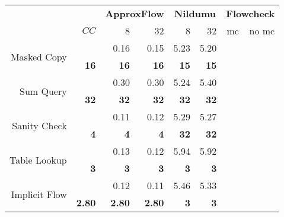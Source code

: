 \begin{table}[]
\begin{tabular}{rr|rr|rr|rr}
                                      & \textbf{}     & \multicolumn{2}{c|}{\textbf{ApproxFlow}}                 & \multicolumn{2}{c|}{\textbf{Nildumu}} & \multicolumn{2}{c}{\textbf{Flowcheck}} \\
                                      & $CC$          & 8                      & 32                     & 8             & 32           & mc             & no mc         \\ \hline
\multirow{2}{*}{Masked Copy}          &               & 0.16                   & 0.15                   & 5.23          & 5.20         &                &               \\
                                      & \textbf{16}   & \textbf{16}            & \textbf{16}            & \textbf{15}   & \textbf{15}  & \textbf{}      & \textbf{}     \\ \hline
\multirow{2}{*}{Sum Query}            &               & 0.30                   & 0.30                   & 5.24          & 5.40         &                &               \\
                                      & \textbf{32}   & \textbf{32}            & \textbf{32}            & \textbf{32}   & \textbf{32}  &                &               \\ \hline
\multirow{2}{*}{Sanity Check}         &               & 0.11                   & 0.12                   & 5.29          & 5.27         &                &               \\
                                      & \textbf{4}    & \textbf{4}             & \textbf{4}             & \textbf{32}   & \textbf{32}  &                &               \\ \hline
\multirow{2}{*}{Table Lookup}         &               & 0.13                   & 0.12                   & 5.94          & 5.92         &                &               \\
                                      & \textbf{3}    & \textbf{3}             & \textbf{3}             & \textbf{3}    & \textbf{3}   &                &               \\ \hline
\multirow{2}{*}{Implicit Flow}        &               & 0.12                   & 0.11                   & 5.46          & 5.33         &                &               \\
                                      & \textbf{2.80} & \textbf{2.80}          & \textbf{2.80}          & \textbf{3}    & \textbf{3}   &                &               \\ \hline

\end{tabular}
\end{table}
